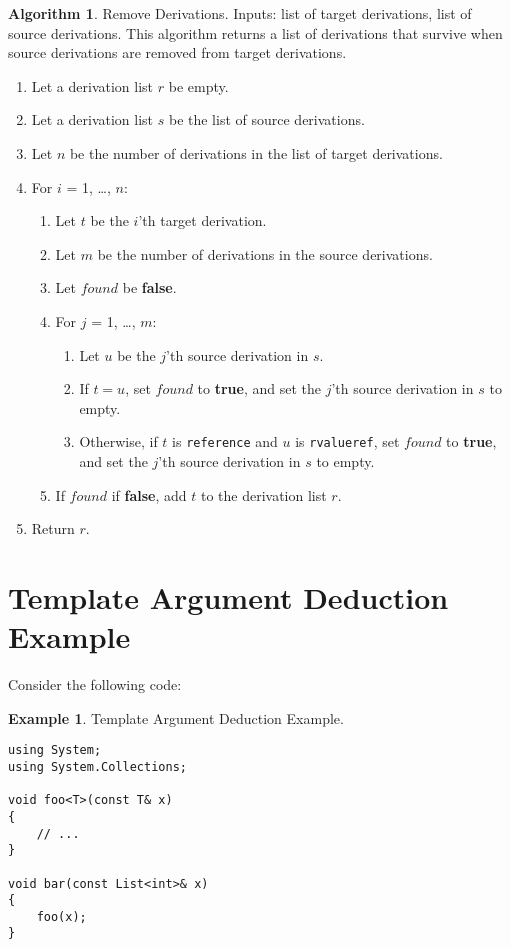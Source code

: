 \documentclass[a4paper,oneside,11pt]{book}
\theoremstyle{definition}
\newtheorem{exmp}{Example}[section]
\newtheorem{algo}{Algorithm}[section]
\begin{document}
\begin{algo}\label{removederivations} Remove Derivations. Inputs: list of target derivations, list of source derivations.
This algorithm returns a list of derivations that survive when source derivations are removed from target derivations.
\begin{enumerate}
\item
Let a derivation list $r$ be empty.
\item
Let a derivation list $s$ be the list of source derivations.
\item
Let $n$ be the number of derivations in the list of target derivations.
\item
For $i$ = 1, \ldots, $n$:
\begin{enumerate}
\item
Let $t$ be the $i$'th target derivation.
\item
Let $m$ be the number of derivations in the source derivations.
\item
Let $found$ be \textbf{false}.
\item
For $j$ = 1, \ldots, $m$:
\begin{enumerate}
\item
Let $u$ be the $j$'th source derivation in $s$.
\item
If $t = u$, set $found$ to \textbf{true}, and set the $j$'th source derivation in $s$ to empty.
\item
Otherwise, if $t$ is \verb|reference| and $u$ is \verb|rvalueref|, set $found$ to \textbf{true}, and set the $j$'th source derivation in $s$ to empty.
\end{enumerate}
\item
If $found$ if \textbf{false}, add $t$ to the derivation list $r$.
\end{enumerate}
\item
Return $r$.
\end{enumerate}
\end{algo}

\section{Template Argument Deduction Example}

Consider the following code:

\begin{exmp} Template Argument Deduction Example.
\lstset{language=Cmajor}
\begin{lstlisting}[frame=trBL]
using System;
using System.Collections;

void foo<T>(const T& x)
{
    // ...
}

void bar(const List<int>& x)
{
    foo(x);
}
\end{lstlisting}
\end{exmp}
\end{document}
